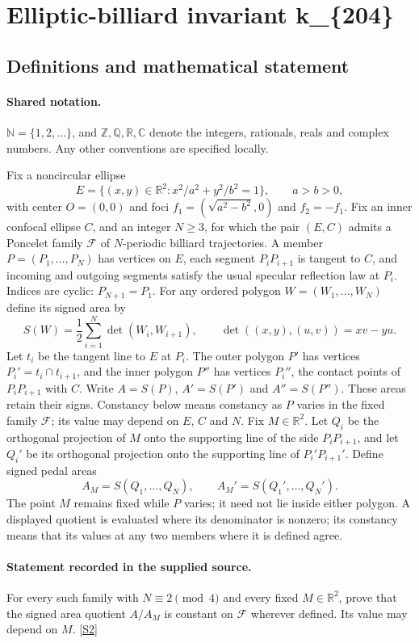 \documentclass[11pt]{article}
\newcommand{\sref}[2]{\hyperlink{source:#1:#2}{[S#2]}}
\begin{document}
\section{Elliptic-billiard invariant k\_\{204\}}\label{statement}

\subsection{Definitions and mathematical statement}

\paragraph{Shared notation.}$\mathbb N=\{1,2,\ldots\}$, and $\mathbb Z,\mathbb Q,\mathbb R,\mathbb C$ denote the integers, rationals, reals and complex numbers. Any other conventions are specified locally.


Fix a noncircular ellipse
\[
E=\{(x,y)\in\mathbb R^2:x^2/a^2+y^2/b^2=1\},\qquad a>b>0,
\]
with center $O=(0,0)$ and foci $f_1=(\sqrt{a^2-b^2},0)$ and $f_2=-f_1$. Fix an inner confocal ellipse $C$, and an integer $N\geq3$, for which the pair $(E,C)$ admits a Poncelet family $\mathcal F$ of $N$-periodic billiard trajectories. A member $P=(P_1,\ldots,P_N)$ has vertices on $E$, each segment $P_iP_{i+1}$ is tangent to $C$, and incoming and outgoing segments satisfy the usual specular reflection law at $P_i$. Indices are cyclic: $P_{N+1}=P_1$.
For any ordered polygon $W=(W_1,\ldots,W_N)$ define its signed area by
\[
S(W)=\frac12\sum_{i=1}^N\det(W_i,W_{i+1}),\qquad
\det((x,y),(u,v))=xv-yu.
\]
Let $t_i$ be the tangent line to $E$ at $P_i$. The outer polygon $P'$ has vertices $P_i'=t_i\cap t_{i+1}$, and the inner polygon $P''$ has vertices $P_i''$, the contact points of $P_iP_{i+1}$ with $C$. Write $A=S(P)$, $A'=S(P')$ and $A''=S(P'')$. These areas retain their signs. Constancy below means constancy as $P$ varies in the fixed family $\mathcal F$; its value may depend on $E$, $C$ and $N$.
Fix $M\in\mathbb R^2$. Let $Q_i$ be the orthogonal projection of $M$ onto the supporting line of the side $P_iP_{i+1}$, and let $Q_i'$ be its orthogonal projection onto the supporting line of $P_i'P_{i+1}'$. Define signed pedal areas
\[
A_M=S(Q_1,\ldots,Q_N),\qquad A_M'=S(Q_1',\ldots,Q_N').
\]
The point $M$ remains fixed while $P$ varies; it need not lie inside either polygon.
A displayed quotient is evaluated where its denominator is nonzero; its constancy means that its values at any two members where it is defined agree.
\paragraph{Statement recorded in the supplied source.}
For every such family with $N\equiv2\pmod4$ and every fixed $M\in\mathbb R^2$, prove that the signed area quotient $A/A_M$ is constant on $\mathcal F$ wherever defined. Its value may depend on $M$. \sref{statement}{2}
\end{document}
